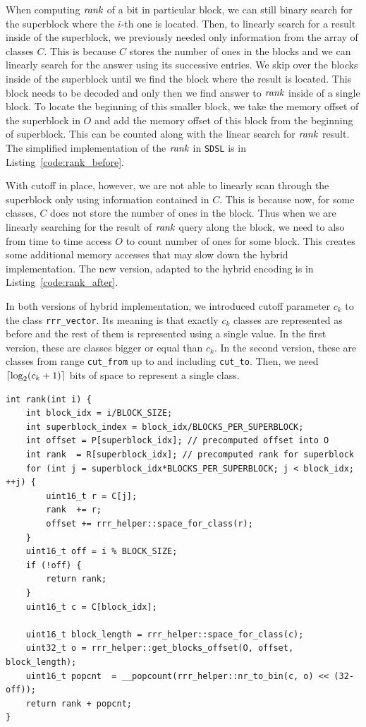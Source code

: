 When computing $\mathit{rank}$ of a bit in particular block, we can still binary search for
the superblock where the $i$-th one is located. Then, to linearly search for a result
inside of the superblock, we previously needed only information from the array of classes $C$.
This is because $C$ stores the number of ones in the blocks and we can linearly
search for the answer using its successive entries. We skip over the blocks inside of the
superblock until we find the block where the result is located. This block needs to be decoded
and only then we find answer to $\mathit{rank}$ inside of a single block. To locate the beginning of this
smaller block, we take the memory offset of the superblock in $O$ and add the memory offset of this
block from the beginning of superblock. This can be counted along with the linear search for $\mathit{rank}$
result. The simplified implementation of the $\mathit{rank}$ in \texttt{SDSL} is in Listing~\ref{code:rank_before}.

With cutoff in place, however, we are not able to linearly scan through the superblock only
using information contained in $C$. This is because now, for some classes, $C$ does not
store the number of ones in the block. Thus when we are linearly searching for the result
of $\mathit{rank}$ query along the block, we need to also from time to time access $O$ to count
number of ones for some block. This creates some additional memory accesses that may slow
down the hybrid implementation. The new version, adapted to the hybrid encoding is in
Listing~\ref{code:rank_after}.

In both versions of hybrid implementation, we introduced cutoff parameter $c_k$ to the
class \texttt{rrr\_vector}. Its meaning is that exactly $c_k$ classes are represented
as before and the rest of them is represented using a single value. In the first version,
these are classes bigger or equal than $c_k$. In the second version, these are classes
from range \texttt{cut\_from} up to and including \texttt{cut\_to}. Then, we need
$\left\lceil \log_2(c_k+1) \right\rceil$ bits of space to represent a single class.

\begin{lstlisting}
int rank(int i) {
	int block_idx = i/BLOCK_SIZE;
	int superblock_index = block_idx/BLOCKS_PER_SUPERBLOCK;
	int offset = P[superblock_idx]; // precomputed offset into O
	int rank  = R[superblock_idx]; // precomputed rank for superblock
	for (int j = superblock_idx*BLOCKS_PER_SUPERBLOCK; j < block_idx; ++j) {
		uint16_t r = C[j];
		rank  += r;
		offset += rrr_helper::space_for_class(r);
	}
	uint16_t off = i % BLOCK_SIZE;
	if (!off) {
		return rank;
	}
	uint16_t c = C[block_idx];

	uint16_t block_length = rrr_helper::space_for_class(c);
	uint32_t o = rrr_helper::get_blocks_offset(O, offset, block_length);
	uint16_t popcnt  = __popcount(rrr_helper::nr_to_bin(c, o) << (32-off));
	return rank + popcnt;
}
\end{lstlisting}

